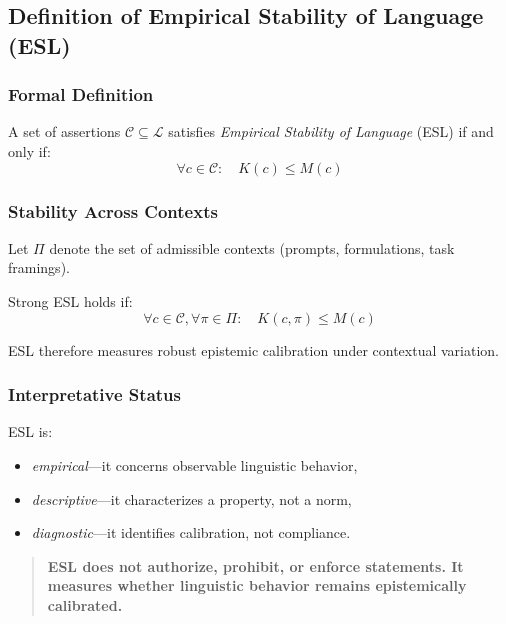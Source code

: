 \subsection{Definition of Empirical Stability of Language (ESL)}

\subsubsection{Formal Definition}

\begin{definition}
A set of assertions $\mathcal{C} \subseteq \mathcal{L}$ satisfies \emph{Empirical Stability of Language} (ESL) if and only if:
\[
\forall c \in \mathcal{C}:\quad K(c) \le M(c)
\]
\end{definition}

\subsubsection{Stability Across Contexts}

Let $\Pi$ denote the set of admissible contexts (prompts, formulations, task framings).

\begin{definition}
Strong ESL holds if:
\[
\forall c \in \mathcal{C}, \forall \pi \in \Pi:\quad K(c,\pi) \le M(c)
\]
\end{definition}

ESL therefore measures robust epistemic calibration under contextual variation.

\subsubsection{Interpretative Status}

ESL is:
\begin{itemize}
    \item \emph{empirical}---it concerns observable linguistic behavior,
    \item \emph{descriptive}---it characterizes a property, not a norm,
    \item \emph{diagnostic}---it identifies calibration, not compliance.
\end{itemize}

\begin{quote}
\textbf{ESL does not authorize, prohibit, or enforce statements. It measures whether linguistic behavior remains epistemically calibrated.}
\end{quote}


